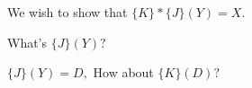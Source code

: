 

We wish to show that $\{K\} * \{J\} (Y) = X.$

What's $\{J\} (Y) ?$













$\{J\} (Y) = D,$ How about $\{K\} (D) ?$









